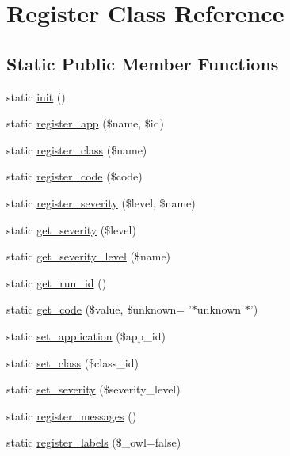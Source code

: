 \section{Register Class Reference}
\label{classRegister}
\subsection*{Static Public Member Functions}
\begin{DoxyCompactItemize}
\item 
static \hyperlink{classRegister_a5c34c30e9e6ce4dea2dbb02f55e9278a}{init} ()
\item 
static \hyperlink{classRegister_ac547568c4a7272fdaf65cb2825eccec3}{register\_\-app} (\$name, \$id)
\item 
static \hyperlink{classRegister_a58300f74d002f1306a03baf12af0f02c}{register\_\-class} (\$name)
\item 
static \hyperlink{classRegister_a875fd1f32f0746aa9e0e00b053c7389a}{register\_\-code} (\$code)
\item 
static \hyperlink{classRegister_ac22a104eefa471675cb28ee20821eaad}{register\_\-severity} (\$level, \$name)
\item 
static \hyperlink{classRegister_ae71e10bddb03483b54ad22b9edb95b7c}{get\_\-severity} (\$level)
\item 
static \hyperlink{classRegister_a70490e59a4a3b910d259b8a4287c3e91}{get\_\-severity\_\-level} (\$name)
\item 
static \hyperlink{classRegister_a041706fafb409a31f125d2075501e82e}{get\_\-run\_\-id} ()
\item 
static \hyperlink{classRegister_abd8556b87ac48f8d8b3abeef6285c8f5}{get\_\-code} (\$value, \$unknown= '$\ast$unknown $\ast$')
\item 
static \hyperlink{classRegister_ad4d61787414f7d64d1e3420f0fdf3f91}{set\_\-application} (\$app\_\-id)
\item 
static \hyperlink{classRegister_a58e49ccb1fe4e441d0329e879c922aa0}{set\_\-class} (\$class\_\-id)
\item 
static \hyperlink{classRegister_a0adde8d67d77b9b4d66156272cb48ae4}{set\_\-severity} (\$severity\_\-level)
\item 
static \hyperlink{classRegister_a688c665a20294826a762cf552b4a00fc}{register\_\-messages} ()
\item 
static \hyperlink{classRegister_ad145e4bc28af91817782399b06422e74}{register\_\-labels} (\$\_\-owl=false)
\end{DoxyCompactItemize}


